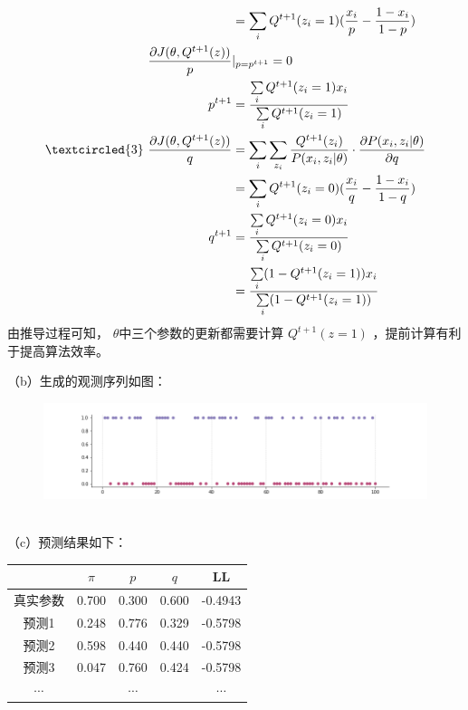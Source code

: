 \documentclass[fleqn,answers]{exam}
\begin{document}
\begin{questions}
\begin{solution}
\begin{align*}
            &=\sum\limits_i
                Q^{t+1}(z_i=1) (\frac{x_i}{p} - \frac{1-x_i}{1-p})\\
        \frac{\partial J(\theta,Q^{t+1}(z))}{p}& \vert_{p=p^{t+1}}=0\\
        p^{t+1}&=\frac{\sum\limits_i Q^{t+1}(z_i=1) x_i}{\sum\limits_i Q^{t+1}(z_i=1)}\\
        \textcircled{3}~
        \frac{\partial J(\theta,Q^{t+1}(z))}{q}&=\sum\limits_i \sum\limits_{z_i} \frac{Q^{t+1}(z_i)}{P(x_i,z_i \vert \theta)} \cdot \frac{\partial P(x_i,z_i \vert \theta)}{\partial q}\\
            \ &=\sum\limits_i
                Q^{t+1}(z_i=0) (\frac{x_i}{q} - \frac{1-x_i}{1-q})\\
        q^{t+1}&=\frac{\sum\limits_i Q^{t+1}(z_i=0) x_i}{\sum\limits_i Q^{t+1}(z_i=0)}\\
            &=\frac{\sum\limits_i (1-Q^{t+1}(z_i=1)) x_i}{\sum\limits_i (1-Q^{t+1}(z_i=1))}\\
    \end{align*}
    由推导过程可知， $\theta$中三个参数的更新都需要计算 $Q^{t+1}(z=1)$ ，提前计算有利于提高算法效率。
\end{solution}
\newpage
（b）生成的观测序列如图：
\begin{figure}[!ht]
    \centering
    \includegraphics[width=18cm]{./figures/1b.png}
\end{figure}\\
（c）预测结果如下：
\begin{table}[!ht]
    \centering
    \begin{tabular}{|c|ccc|c|}\hline
        &$\pi$&$p$&$q$&LL\\ \hline
        真实参数&0.700&0.300&0.600&-0.4943\\ \hline
        预测1& 0.248&0.776&0.329&-0.5798\\
        预测2& 0.598&0.440&0.440&-0.5798\\
        预测3& 0.047&0.760&0.424&-0.5798\\
        $\cdots$&&$\cdots$&&$\cdots$\\ \hline
    \end{tabular}
\end{table}\\

\end{questions}
\end{document}
